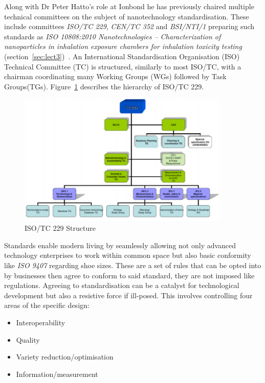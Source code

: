 
{}

Along with Dr Peter Hatto's role at Ionbond he has previously chaired multiple technical committees on the subject of nanotechnology standardisation.
These include committees \emph{ISO/TC 229}, \emph{CEN/TC 352} and \emph{BSI/NTI/1} preparing such standards as \emph{ISO 10808:2010 Nanotechnologies -- Characterization of nanoparticles in inhalation exposure chambers for inhalation toxicity testing} (section~\ref{sec:lect3})~\cite{iso10808}.
An International Standardisation Organisation (ISO) Technical Committee (TC) is structured, similarly to most ISO/TC, with a chairman coordinating many Working Groups (WGs) followed by Task Groups(TGs).
Figure~\ref{figure:tc229} describes the hierarchy of ISO/TC 229. 

\begin{figure}[!h]
\centering
\includegraphics[width = 0.9\textwidth]{Figures/TC229.pdf}
\caption{ISO/TC 229 Structure \cite{isotc229}}
\label{figure:tc229}
\end{figure}

Standards enable modern living by seamlessly allowing not only advanced technology enterprises to work within common space but also basic conformity like \emph{ISO 9407} regarding shoe sizes.
These are a set of rules that can be opted into by businesses then agree to conform to said standard, they are not imposed like regulations.
Agreeing to standardisation can be a catalyst for technological development but also a resistive force if ill-posed.  
This involves controlling four areas of the specific design:

\begin{itemize}
	\item Interoperability
	\item Quality
	\item Variety reduction/optimisation
	\item Information/measurement
\end{itemize}

